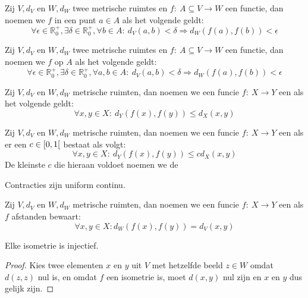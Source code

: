 \documentclass[main.tex]{subfiles}
\begin{document}
\begin{de}
  Zij $V,d_{V}$ en $W,d_{W}$ twee metrische ruimtes en $f:\ A \subseteq V \rightarrow W$ een functie, dan noemen we $f$  in een punt $a\in A$ als het volgende geldt:
  \[ \forall \epsilon \in \mathbb{R}_{0}^{+}, \exists \delta \in \mathbb{R}_{0}^{+}, \forall b \in A:\ d_{V}(a,b)< \delta \Rightarrow d_{W}(f(a),f(b)) < \epsilon \]
\end{de}

\begin{de}
  Zij $V,d_{V}$ en $W,d_{W}$ twee metrische ruimtes en $f:\ A \subseteq V \rightarrow W$ een functie, dan noemen we $f$  op $A$ als het volgende geldt:
  \[ \forall \epsilon \in \mathbb{R}_{0}^{+}, \exists \delta \in \mathbb{R}_{0}^{+}, \forall a,b \in A:\ d_{V}(a,b)< \delta \Rightarrow d_{W}(f(a),f(b)) < \epsilon \]
\end{de}

\begin{de}
  Zij $V,d_{V}$ en $W,d_{W}$ metrische ruimten, dan noemen we een funcie $f:\ X \rightarrow Y$ een  als het volgende geldt:
  \[ \forall x,y\in X:\ d_{Y}(f(x),f(y)) \le d_{X}(x,y) \]
\end{de}

\begin{de}
  Zij $V,d_{V}$ en $W,d_{W}$ metrische ruimten, dan noemen we een funcie $f:\ X \rightarrow Y$ een  als er een $c\in \interval[open right]{0}{1}$ bestaat als volgt:
  \[ \forall x,y\in X:\ d_{Y}(f(x),f(y)) \le c d_{X}(x,y) \]
  De kleinste $c$ die hieraan voldoet noemen we de 
\end{de}

\begin{st}
  Contracties zijn uniform continu.
\end{st}

\begin{de}
  Zij $V,d_{V}$ en $W,d_{W}$ metrische ruimten, dan noemen we een funcie $f:\ X \rightarrow Y$ een  als $f$ afstanden bewaart:
  \[ \forall x,y \in X: d_{W}(f(x),f(y)) = d_{V}(x,y) \]
\end{de}

\begin{st}
  \label{st:isometrie-dan-injectie}
  Elke isometrie is injectief.

  \begin{proof}
    Kies twee elementen $x$ en $y$ uit $V$ met hetzelfde beeld $z\in W$ omdat $d(z,z)$ nul is, en omdat $f$ een isometrie is, moet $d(x,y)$ nul zijn en $x$ en $y$ dus gelijk zijn.
  \end{proof}
\end{st}
\end{document}
